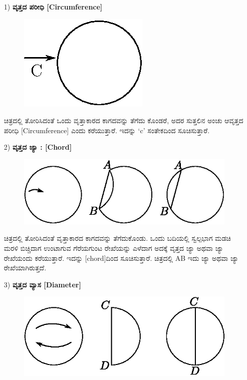 \begin{enumerate}
\item[1)] \textbf{ವೃತ್ತದ ಪರೀಧಿ [Circumference]} 
\begin{figure}[H]
\centering
\includegraphics[scale=.9]{src/figure/chap1/fig1-24.eps}
\end{figure}
 
 ಚಿತ್ರದಲ್ಲಿ ತೋರಿಸಿದಂತೆ ಒಂದು ವೃತ್ತಾಕಾರದ ಕಾಗದವನ್ನು ತೆಗೆದು ಕೊಂಡರೆ, ಅದರ ಸುತ್ತಲಿನ ಅಂಚು ಆವೃತ್ತದ ಪರೀಧಿ [Circumference] ಎಂದು ಕರೆಯುತ್ತಾರೆ. ಇದನ್ನು `c' ಸಂತೇಕದಿಂದ ಸೂಚಿಸುತ್ತಾರೆ. 
 
\item[2)] \textbf{ವೃತ್ತದ ಜ್ಯಾ : [Chord]}
\begin{figure}[H]
\centering
\includegraphics[scale=.9]{src/figure/chap1/fig1-24a.eps}
\end{figure}
 
 ಚಿತ್ರದಲ್ಲಿ ತೋರಿಸಿದಂತೆ ವೃತ್ತಾಕಾರದ ಕಾಗದವನ್ನು ತೆಗೆದುಕೊಂಡು. ಒಂದು ಬದಿಯಲ್ಲಿ ಸ್ವಲ್ಪಭಾಗ ಮಡಚಿ ಮರಳಿ ಬಿಚ್ಚಿದಾಗ ಉಂಟಾಗುವ ಗೆರೆಯಗುಂಟ ರೇಖೆಯನ್ನು ಎಳೆದಾಗ ಅದಕ್ಕೆ ವೃತ್ತದ ಜ್ಯಾ ಅಥವಾ ಜ್ಯಾ ರೇಖೆಯಂದು ಕರೆಯುತ್ತಾರೆ. ಇದನ್ನು [chord]ದಿಂದ ಸೂಚಿಸುತ್ತಾರೆ. ಚಿತ್ರದಲ್ಲಿ AB ಇದು ಜ್ಯಾ ಅಥವಾ ಜ್ಯಾ ರೇಖೆಯಾಗಿರುತ್ತದೆ. 
 
\item[3)] \textbf{ವೃತ್ತದ ವ್ಯಾಸ [Diameter]}
\begin{figure}[H]
\centering
\includegraphics[scale=.98]{src/figure/chap1/fig1-24b.eps}
\end{figure} 


\end{enumerate}
